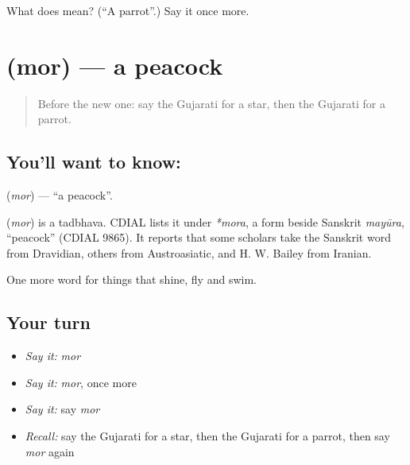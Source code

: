 \begin{tcolorbox}[breakable,colback=teal!4,colframe=teal!35!black,title={Before you move on}]
What does  mean? (\textquotedblleft{}A parrot\textquotedblright{}.) Say it once more.
\end{tcolorbox}
\section[\texorpdfstring{\gu{મોર} (mor)}{મોર (mor)}]{ (mor) — a peacock}

\label{lesson:GU-C69-peacock}



\begin{quote}
Before the new one: say the Gujarati for a star, then the Gujarati for a parrot.
\end{quote}

\subsection*{You'll want to know: }
\textbf{} (\emph{mor}) — \textquotedblleft{}a peacock\textquotedblright{}.

\begin{cousinweb}
\textbf{} (\emph{mor}) is a tadbhava. CDIAL lists it under \emph{*mora}, a form beside Sanskrit \emph{mayūra}, \textquotedblleft{}peacock\textquotedblright{} (CDIAL 9865). It reports that some scholars take the Sanskrit word from Dravidian, others from Austroasiatic, and H. W. Bailey from Iranian.
\end{cousinweb}

\begin{grammarlens}[title={What you've built}]
One more word for things that shine, fly and swim.
\end{grammarlens}

\subsection*{Your turn}
\begin{itemize}
\raggedright
  \item \emph{Say it:} \emph{mor}
  \item \emph{Say it:} \emph{mor}, once more
  \item \emph{Say it:} say \emph{mor}
  \item \emph{Recall:} say the Gujarati for a star, then the Gujarati for a parrot, then say \emph{mor} again
\end{itemize}

